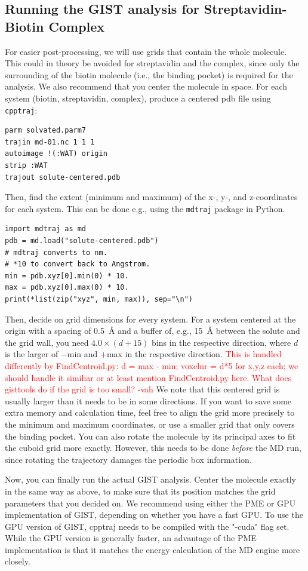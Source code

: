 \documentclass[9pt,tutorial]{livecoms}
\newcommand{\software}{\texttt}
\newcommand{\todo}{\textcolor{red}}
\begin{document}
\subsection{Running the GIST analysis for Streptavidin-Biotin Complex}
For easier post-processing, we will use grids that contain the whole molecule.
This could in theory be avoided for streptavidin and the complex, since only the surrounding of the biotin molecule (i.e., the binding pocket) is required for the analysis.
We also recommend that you center the molecule in space.
For each system (biotin, streptavidin, complex), produce a centered pdb file using \software{cpptraj}:
\begin{lstlisting}[style=cpptraj]
parm solvated.parm7
trajin md-01.nc 1 1 1
autoimage !(:WAT) origin
strip :WAT
trajout solute-centered.pdb
\end{lstlisting}
Then, find the extent (minimum and maximum) of the x-, \mbox{y-,} and z-coordinates for each system.
This can be done e.g., using the \software{mdtraj} package in Python.
\begin{lstlisting}[style=python]
import mdtraj as md
pdb = md.load("solute-centered.pdb")
# mdtraj converts to nm.
# *10 to convert back to Angstrom.
min = pdb.xyz[0].min(0) * 10.
max = pdb.xyz[0].max(0) * 10.
print(*list(zip("xyz", min, max)), sep="\n")
\end{lstlisting}
Then, decide on grid dimensions for every system.
For a system centered at the origin with a spacing of \SI{0.5}{\angstrom} and a buffer of, e.g., \SI{15}{\angstrom} between the solute and the grid wall, you need $4.0\times (d+15)$ bins in the respective direction, where $d$ is the larger of $-$min and $+$max in the respective direction.
\todo{ This is handled differently by FindCentroid.py: d = max - min; voxelnr = 
d*5 for x,y,z each; we should handle it similiar or at least mention 
FindCentroid.py here. 
What does gisttools do if the grid is too small? -vah }
We note that this centered grid is usually larger than it needs to be in some directions.
If you want to save some extra memory and calculation time, feel free to align the grid more precisely to the minimum and maximum coordinates, or use a smaller grid that only covers the binding pocket.
You can also rotate the molecule by its principal axes to fit the cuboid grid more exactly.
However, this needs to be done \emph{before} the MD run, since rotating the trajectory damages the periodic box information.

Now, you can finally run the actual GIST analysis. Center the molecule exactly in the same way as above, to make sure that its position matches the grid parameters that you decided on.
We recommend using either the PME or GPU implementation of GIST, depending on whether you have a fast GPU. To use the GPU version of GIST, cpptraj needs to be compiled with the "-cuda" flag set.
While the GPU version is generally faster, an advantage of the PME implementation is that it matches the energy calculation of the MD engine more closely.
\end{document}
